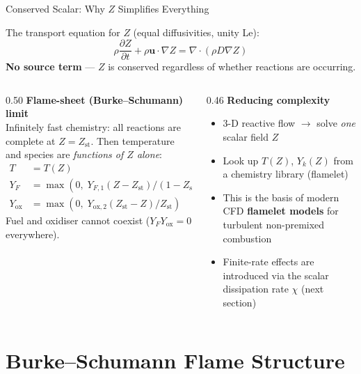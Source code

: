 \documentclass[12pt,aspectratio=169]{beamer}
\newcommand{\pd}[2]{\frac{\partial #1}{\partial #2}}
\newcommand{\Zst}{Z_{\text{st}}}
\begin{document}
\begin{frame}{Conserved Scalar: Why $Z$ Simplifies Everything}

  The transport equation for $Z$ (equal diffusivities, unity Le):
  \[
    \rho\pd{Z}{t} + \rho\mathbf{u}\cdot\nabla Z
    = \nabla\cdot(\rho D\nabla Z)
  \]
  \textbf{No source term} --- $Z$ is conserved regardless of whether
  reactions are occurring.

  \begin{columns}[t]
    \begin{column}{0.50\textwidth}
      \textbf{Flame-sheet (Burke--Schumann) limit}\\[3pt]
      Infinitely fast chemistry: all reactions are complete at $Z=\Zst$.
      Then temperature and species are \emph{functions of $Z$ alone}:
      \begin{align*}
        T &= T(Z)\\
        Y_F &= \max(0,\;Y_{F,1}(Z-\Zst)/(1-\Zst))\\
        Y_{\text{ox}} &= \max(0,\;Y_{\text{ox},2}(\Zst-Z)/\Zst)
      \end{align*}
      Fuel and oxidiser cannot coexist
      ($Y_F Y_{\text{ox}} = 0$ everywhere).
    \end{column}
    \begin{column}{0.46\textwidth}
      \textbf{Reducing complexity}
      \begin{itemize}
        \item 3-D reactive flow $\to$ solve \emph{one} scalar field $Z$
        \item Look up $T(Z)$, $Y_k(Z)$ from a
              chemistry library (flamelet)
        \item This is the basis of modern CFD
              \textbf{flamelet models} for turbulent non-premixed
              combustion
        \item Finite-rate effects are introduced via the scalar
              dissipation rate $\chi$ (next section)
      \end{itemize}
    \end{column}
  \end{columns}
\end{frame}

\section{Burke--Schumann Flame Structure}
\end{document}
